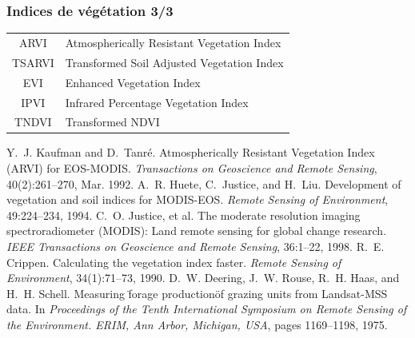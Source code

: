 \documentclass[compress]{beamer}
\begin{document}
\begin{frame}
\frametitle{Indices de végétation 3/3}
\footnotesize \centering
\begin{tabular}{|c|l|}
\hline
ARVI & Atmospherically Resistant  Vegetation Index \cite{ARVI} \\
TSARVI & Transformed Soil Adjusted Vegetation Index   \cite{ARVI} \\
EVI & Enhanced Vegetation Index \cite{Huete1994-EVI,Justice1998-EVI} \\
IPVI & Infrared Percentage Vegetation Index  \cite{Crippen1990-IPVI} \\
TNDVI & Transformed NDVI  \cite{Deering1975-TNDVI} \\
\hline
\end{tabular}
\begin{thebibliography}{noidea}
\tiny
{}
Y.~J. Kaufman and D.~Tanr\'e.
 {Atmospherically Resistant Vegetation Index (ARVI) for EOS-MODIS}.
 {\em Transactions on Geoscience and Remote Sensing}, 40(2):261--270,
  Mar. 1992.
A.~R. Huete, C.~Justice, and H.~Liu.
 Development of vegetation and soil indices for {MODIS-EOS}.
 {\em Remote Sensing of Environment}, 49:224--234, 1994.
C.~O. Justice, et al.
 The moderate resolution imaging spectroradiometer ({MODIS}): Land
  remote sensing for global change research.
 {\em IEEE Transactions on Geoscience and Remote Sensing}, 36:1--22,
  1998.
R.~E. Crippen.
 Calculating the vegetation index faster.
 {\em Remote Sensing of Environment}, 34(1):71--73, 1990.
D.~W. Deering, J.~W. Rouse, R.~H. Haas, and H.~H. Schell.
 Measuring \"forage production\" of grazing units from {L}andsat-{MSS}
  data.
 In {\em Proceedings of the Tenth International Symposium on Remote
  Sensing of the Environment. ERIM, Ann Arbor, Michigan, USA}, pages
  1169--1198, 1975.
\end{thebibliography}
\end{frame}
\end{document}

